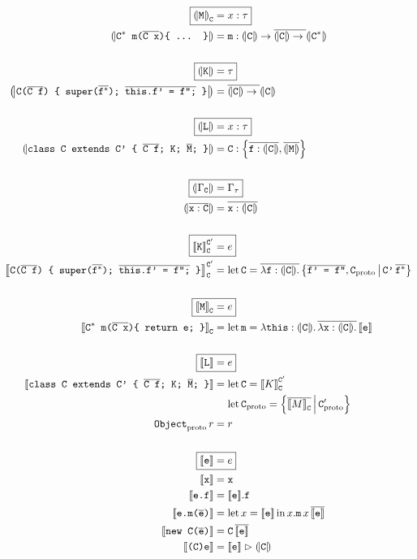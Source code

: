 \begin{align*}    
    \Aboxed{\denoty{\fj M}_{\fj C} &= x : \tau} \\
    \denoty{\fjmethdefx} &= \fj m : \denoty{\fj C} \to \overline{\denoty{\fj C} \to {}} \denoty{\fj{C}^*} \\
    \\
    \Aboxed{\denoty{\fj K} &= \tau} \\
    \denoty{\fjconsdef} &= \overline{\denoty{\fj C} \to {}} \denoty{\fj{C}} \\
    \\
    \Aboxed{\denoty{\fj L} &= x : \tau} \\
    \denoty{\fjclassdef} &= \fj C : \flrec{\overline{\fj{f}: \denoty{\fj{C}}}, \overline{\denoty{\fj M}}} \\
    \\
    \Aboxed{\denoty{\Gamma_{\fj C}} &= \Gamma_\tau} \\
    \denoty{\overline{\fj x : \fj C}} &= \overline{\fj x : \denoty{\fj C}} \\
    \\
    \Aboxed{\denot{\fj K}_{\fj{C}}^{\fj{C}'} &= e} \\
    \denot{\fjconsdef}_{\fj{C}}^{\fj{C}'} &= \flletx{\fj C}{\overline{\fllam{\fj f : \denoty{\fj C}}}\, \flext{\fj{\fjoverline{f' = f''}}, \fj C_\mathrm{proto}}{\fj{C'}\,\overline{\fj{f}^*}}}
    \\ \\
    \Aboxed{\denot{\fj M}_{\fj C} &= e} \\
    \denot{\fjmethdef}_{\fj C} &= \flletx{\fj m}{\fllam{\fj{this} : \denoty{\fj C}} \overline{\fllam{\fj x: \denoty{\fj C}}}\, \denot{\fj e}}
    \\ \\
    \Aboxed{\denot{\fj L} &= e} \\
    \denot{\fjclassdef} &= \flletx{\fj C}{\denot{K}_{\fj C}^{\fj C'}} \\
    &\phantom{{}={}} \flletx{\fj{C}_\mathrm{proto}}{\flext{\overline{\denot{M}_{\fj C}}}{\fj C'_\mathrm{proto}}} \\
    \fj{Object}_\mathrm{proto}\,r &= r
    \\ \\
    \Aboxed{\denot{\fj e} &= e} \\
    \denot{\fj x} &= \fj x \\
    \denot{\fj {e.f}} &= \flproj{\denot{\fj e}}{\fj f} \\
    \denot{\fj {e.m(\fjoverline e)}} &= \fllet{x}{\denot{\fj e}} \flproj{x}{\fj m}\,x\,\overline{\denot{\fj e}} \\
    \denot{\fj {new C(\fjoverline e)}} &= \fj{C}\,\overline{\denot{\fj e}} \\
    \denot{\fj {(C)e}} &= \flcast{\denot {\fj e}}{\denoty {\fj C}} 
\end{align*}